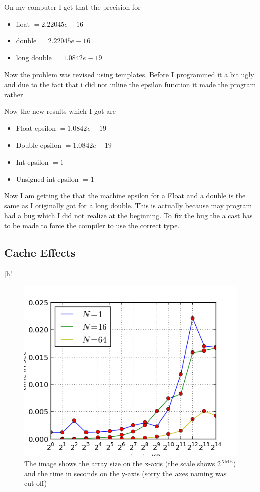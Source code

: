 \documentclass[a4paper,10pt]{article}
\begin{document}
On my computer I get that the precision for
\begin{itemize}
	\item float $=2.22045e-16$
	\item double $= 2.22045e-16$
	\item long double $= 1.0842e-19$
\end{itemize}	

Now the problem was revised using templates. Before I programmed it a bit ugly and due to the fact that i did not inline the epsilon function it made the program rather 

Now the new results which I got are

\begin{itemize}	
	\item Float epsilon $= 1.0842e-19$
	\item Double epsilon $= 1.0842e-19$
	\item Int epsilon $= 1$
	\item Unsigned int epsilon $= 1$
\end{itemize}

Now I am getting the that the machine epsilon for a Float and a double is the same as I originally got for a long double. This is actually because may program had a bug which I did not realize at the beginning. To fix the bug the a cast has to be made to force the compiler to use the correct type.

\subsection{Cache Effects}[h!]
\begin{figure}
\centering
\includegraphics[scale=0.8]{CacheSize.png} 
\caption{The image shows the array size on the x-axis (the scale shows $2^{X \text{MB}}$) and the time in seconds on the y-axis (sorry the axes naming was cut off)}
\label{fig1}
\end{figure}
\end{document}
